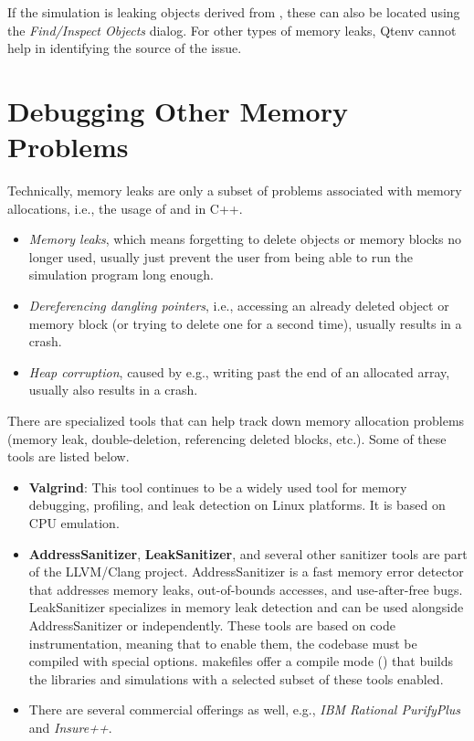 If the simulation is leaking objects derived from , these
can also be located using the \textit{Find/Inspect Objects} dialog. For other
types of memory leaks, Qtenv cannot help in identifying the source of the issue.


\section{Debugging Other Memory Problems}
\label{sec:run-sim:memory-leaks-and-crashes}

Technically, memory leaks are only a subset of problems associated with memory
allocations, i.e., the usage of  and  in C++.

\begin{itemize}
   \item \textit{Memory leaks}, which means forgetting to delete objects
     or memory blocks no longer used, usually just prevent the user from
     being able to run the simulation program long enough.
   \item \textit{Dereferencing dangling pointers}, i.e., accessing
    an already deleted object or memory block (or trying to delete one
    for a second time), usually results in a crash.
   \item \textit{Heap corruption}, caused by e.g., writing past the end of
   an allocated array, usually also results in a crash.
\end{itemize}


There are specialized tools that can help track down memory allocation
problems (memory leak, double-deletion, referencing deleted blocks, etc.). Some
of these tools are listed below.

\begin{itemize}
  \item \textbf{Valgrind}: This tool continues to be a widely used tool for memory
    debugging, profiling, and leak detection on Linux platforms. It is based on CPU emulation.
  \item \textbf{AddressSanitizer}, \textbf{LeakSanitizer}, and several other
    sanitizer tools are part of the LLVM/Clang project. AddressSanitizer is a
    fast memory error detector that addresses memory leaks, out-of-bounds
    accesses, and use-after-free bugs. LeakSanitizer specializes in memory leak
    detection and can be used alongside AddressSanitizer or independently.
    These tools are based on code instrumentation, meaning that to enable them,
    the codebase must be compiled with special options. {\opp} makefiles offer a
    compile mode () that builds the {\opp} libraries and
    simulations with a selected subset of these tools enabled.
  \item There are several commercial offerings as well, e.g., \textit{IBM
    Rational PurifyPlus} and \textit{Insure++}.
\end{itemize}


